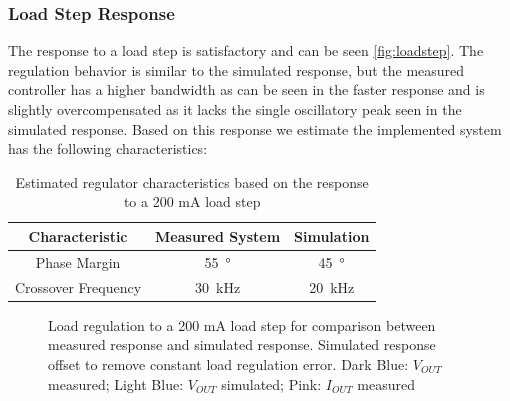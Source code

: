 \subsubsection{Load Step Response}
The response to a load step is satisfactory and can be seen \autoref{fig:loadstep}. The regulation behavior is similar to the simulated response, but the measured controller has a higher bandwidth as can be seen in the faster response and is slightly overcompensated as it lacks the single oscillatory peak seen in the simulated response. Based on this response we estimate the implemented system has the following characteristics:

\begin{table}[H]
    \centering
    \begin{tabular}{|c|c|c|}
        Characteristic & Measured System & Simulation \\
        \hline
         Phase Margin  & \qty{55}{\degree} & \qty{45}{\degree}\\
		 Crossover Frequency & \qty{30}{\kilo\hertz} & \qty{20}{\kilo\hertz}  \\
    \end{tabular}
    \caption{Estimated regulator characteristics based on the response to a 200 mA load step}
    \label{tab:regChar}
\end{table}

\begin{figure}[ht]
	\centering
	
	\caption{Load regulation to a 200 mA load step for comparison between measured response and simulated response. Simulated response offset to remove constant load regulation error. Dark Blue: $V_{OUT}$ measured; Light Blue: $V_{OUT}$ simulated; Pink: $I_{OUT}$ measured}
	\label{fig:loadstep}
\end{figure}
\clearpage

